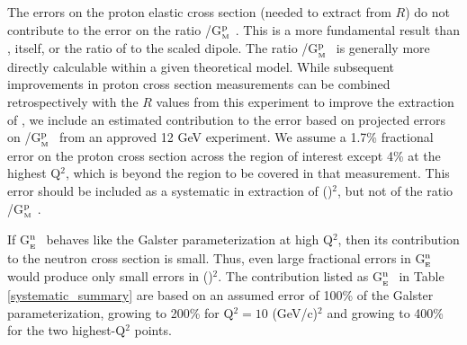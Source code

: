 \documentclass[12pt,letterpaper,oneside]{article}
\begin{document}
The errors on the proton elastic
cross section (needed to extract \gmn from $R$) do not contribute to
the error on the ratio \gmnc/{G$^{\mbox{\scriptsize p}}_{_{\mbox{\tiny M}}}~$}.
This is a more fundamental result than \gmnc, itself, or the ratio of
\gmn to the scaled dipole.  The ratio 
\gmnc/{G$^{\mbox{\scriptsize p}}_{_{\mbox{\tiny M}}}~$} is generally
more directly calculable within a given theoretical model.
While subsequent
improvements in proton cross section measurements 
can be combined retrospectively with the $R$ values from this
experiment to improve the extraction of \gmnc, we include an estimated
contribution to the error based on projected errors on 
\gmnc/{G$^{\mbox{\scriptsize p}}_{_{\mbox{\tiny M}}}~$} from 
an approved 12 GeV experiment\cite{E12-07-108}.  We assume a 1.7\%
fractional error on the proton cross section across the region of
interest except 4\% at the highest Q$^2$, which is beyond the region
to be 
covered in that measurement.  
This error should be included as a systematic in extraction
of (\gmnc)$^2$, but not of the ratio 
\gmnc/{G$^{\mbox{\scriptsize p}}_{_{\mbox{\tiny M}}}~$}.


If {G$^{\mbox{\scriptsize n}}_{_{\mbox{\tiny E}}}~$} behaves like the
Galster parameterization at high Q$^2$, then its contribution 
to the neutron cross section is small.  Thus, even large fractional
errors in {G$^{\mbox{\scriptsize n}}_{_{\mbox{\tiny E}}}~$} would
produce only small errors in (\gmnc)$^2$.  The contribution listed as 
{G$^{\mbox{\scriptsize n}}_{_{\mbox{\tiny E}}}~$} in Table 
\ref{systematic_summary} are based on an assumed error of 100\% of the
Galster parameterization, growing to 200\% for Q$^2=10$ (GeV/c)$^2$
and growing to 400\% for the two highest-Q$^2$ points.
\end{document}
